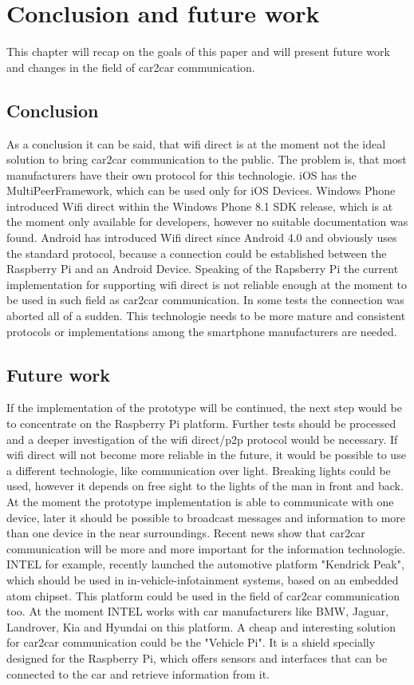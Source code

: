 \chapter{Conclusion and future work}
\label{cha:ConclusionFutureWork}
This chapter will recap on the goals of this paper and will present future work and changes in the field of car2car communication.

\section{Conclusion}
\label{sec:Conclusion}
As a conclusion it can be said, that wifi direct is at the moment not the ideal solution to bring car2car communication to the public. The problem is, that most manufacturers have their own protocol for this technologie. iOS has the MultiPeerFramework, which can be used only for iOS Devices. Windows Phone introduced Wifi direct within the Windows Phone 8.1 SDK release, which is at the moment only available for developers, however no suitable documentation was found. Android has introduced Wifi direct since Android 4.0 and obviously uses the standard protocol, because a connection could be established between the Raspberry Pi and an Android Device. Speaking of the Rapsberry Pi the current implementation for supporting wifi direct is not reliable enough at the moment to be used in such field as car2car communication. In some tests the connection was aborted all of a sudden. This technologie needs to be more mature and consistent protocols or implementations among the smartphone manufacturers are needed.

\section{Future work}
\label{sec:FutureWork}
If the implementation of the prototype will be continued, the next step would be to concentrate on the Raspberry Pi platform. Further tests should be processed and a deeper investigation of the wifi direct/p2p protocol would be necessary. If wifi direct will not become more reliable in the future, it would be possible to use a different technologie, like communication over light. Breaking lights could be used, however it depends on free sight to the lights of the man in front and back. At the moment the prototype implementation is able to communicate with one device, later it should be possible to broadcast messages and information to more than one device in the near surroundings. Recent news show that car2car communication will be more and more important for the information technologie. INTEL for example, recently launched the automotive platform "Kendrick Peak", which should be used in in-vehicle-infotainment systems, based on an embedded atom chipset. This platform could be used in the field of car2car communication too. At the moment INTEL works with car manufacturers like BMW, Jaguar, Landrover, Kia and Hyundai on this platform. A cheap and interesting solution for car2car communication could be the "Vehicle Pi". It is a shield specially designed for the Raspberry Pi, which offers sensors and interfaces that can be connected to the car and retrieve information from it. 